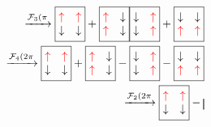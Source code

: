 \documentclass[prl,aps,twocolumn,showpacs,superscriptaddress,longbibliography]{revtex4-1}
\begin{document}
\begin{eqnarray}
	\xrightarrow[]{\mathcal{F}_3(\pi}
\boxed{
\begin{matrix}
  {\color{red} \uparrow} & {\color{red} \uparrow} \\
  \downarrow & \downarrow
 \end{matrix}
}
+
\boxed{
\begin{matrix}
  {\color{red} \uparrow} & \downarrow \\
  {\color{red} \uparrow} & \downarrow
 \end{matrix}
}
\boxed{
\begin{matrix}
  \downarrow & {\color{red} \uparrow} \\
  \downarrow & {\color{red} \uparrow}
 \end{matrix}
}
+
\boxed{
\begin{matrix}
  \downarrow & \downarrow \\
  {\color{red} \uparrow} & {\color{red} \uparrow}
 \end{matrix}
} 
\nonumber \\
	\xrightarrow[]{\mathcal{F}_4(2\pi}
\boxed{
\begin{matrix}
  {\color{red} \uparrow} & {\color{red} \uparrow} \\
  \downarrow & \downarrow
 \end{matrix}
}
+
\boxed{
\begin{matrix}
  {\color{red} \uparrow} & \downarrow \\
  {\color{red} \uparrow} & \downarrow
 \end{matrix}
}
-
\boxed{
\begin{matrix}
  \downarrow & {\color{red} \uparrow} \\
  \downarrow & {\color{red} \uparrow}
 \end{matrix}
}
-
\boxed{
\begin{matrix}
  \downarrow & \downarrow \\
  {\color{red} \uparrow} & {\color{red} \uparrow}
 \end{matrix}
} 
\nonumber \\
	\xrightarrow[]{\mathcal{F}_2(2\pi}
\boxed{
\begin{matrix}
  {\color{red} \uparrow} & {\color{red} \uparrow} \\
  \downarrow & \downarrow
 \end{matrix}
}
-
\boxed{
\begin{matrix}

\end{matrix}}
\end{eqnarray}
\end{document}
